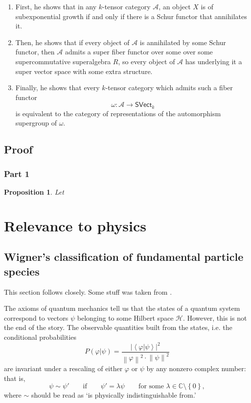 \documentclass[a4paper,10pt]{scrreprt}
\newcommand{\C}{\mathbb{C}}
\newcommand{\norm}[1]{\left\lVert#1\right\rVert}
\theoremstyle{definition}
\theoremstyle{plain}
\newtheorem{proposition}{Proposition}[section]
\theoremstyle{remark}
\begin{document}
\begin{enumerate}
  \item \label{item:proofsketch1} First, he shows that in any $k$-tensor category $\mathscr{A}$, an object $X$ is of subexponential growth if and only if there is a Schur functor that annihilates it.

  \item \label{item:proofsketch2} Then, he shows that if every object of $\mathscr{A}$ is annihilated by some Schur functor, then $\mathscr{A}$ admits a super fiber functor over some over some supercommutative superalgebra $R$, so every object of $\mathscr{A}$ has underlying it a super vector space with some extra structure.

  \item \label{item:proofsketch3} Finally, he shows that every $k$-tensor category which admits such a fiber functor 
    \begin{equation*}
      \omega\colon \mathscr{A} \to \mathsf{SVect}_{k}
    \end{equation*}
    is equivalent to the category of representations of the automorphism supergroup of $\omega$.
\end{enumerate}

\section{Proof}
\subsection{Part 1}
\begin{proposition}
  \label{prop:deligne1}
  Let 
\end{proposition}
\chapter{Relevance to physics}
\section{Wigner's classification of fundamental particle species}
This section follows \cite{haag-local-quantum-physics} closely. Some stuff was taken from \cite{sexl-urbantke-relativity-groups-particles}.

The axioms of quantum mechanics tell us that the states of a quantum system correspond to vectors $\psi$ belonging to some Hilbert space $\mathscr{H}$. However, this is not the end of the story. The observable quantities built from the states, i.e. the conditional probabilities
\begin{equation*}
  P(\varphi | \psi) = \frac{\left|\left\langle \varphi | \psi \right\rangle\right|^{2}}{\norm{\varphi}^{2} \cdot \norm{\psi}^{2}}
\end{equation*}
are invariant under a rescaling of either $\varphi$ or $\psi$ by any nonzero complex number: that is,
\begin{equation*}
  \psi \sim \psi' \qquad\text{if}\qquad \psi' = \lambda \psi\qquad\text{for some }\lambda \in \C\setminus\left\{ 0 \right\},
\end{equation*}
where $\sim$ should be read as `is physically indistinguishable from.'
\end{document}
